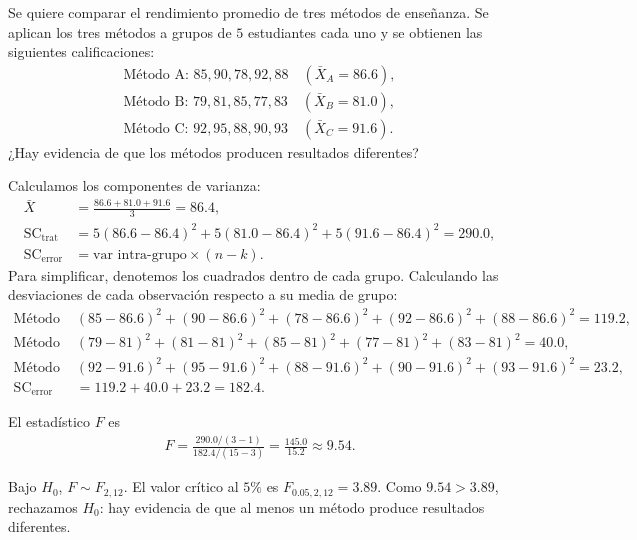 \begin{ejemplo}
 \label{exmp:3.2.6}
Se quiere comparar el rendimiento promedio de tres m\'etodos de ense\~nanza. Se
aplican los tres m\'etodos a grupos de $5$ estudiantes cada uno y se obtienen las
siguientes calificaciones:
\begin{align}
 \text{M\'etodo A: } 85, 90, 78, 92, 88 \quad (\bar{X}_A = 86.6), \\
 \text{M\'etodo B: } 79, 81, 85, 77, 83 \quad (\bar{X}_B = 81.0), \\
 \text{M\'etodo C: } 92, 95, 88, 90, 93 \quad (\bar{X}_C = 91.6).
\end{align}
¿Hay evidencia de que los m\'etodos producen resultados diferentes?
\end{ejemplo}

\begin{solucion}
Calculamos los componentes de varianza:
\begin{align}
 \bar{X} &= \frac{86.6 + 81.0 + 91.6}{3} = 86.4, \\
 \text{SC}_{\text{trat}} &= 5(86.6 - 86.4)^2 + 5(81.0 - 86.4)^2 + 5(91.6 - 86.4)^2 = 290.0, \\
 \text{SC}_{\text{error}} &= \text{var intra-grupo} \times (n - k).
\end{align}
Para simplificar, denotemos los cuadrados dentro de cada grupo. Calculando las
desviaciones de cada observaci\'on respecto a su media de grupo:
\begin{align}
 \text{M\'etodo A: } & (85-86.6)^2 + (90-86.6)^2 + (78-86.6)^2 + (92-86.6)^2 + (88-86.6)^2 = 119.2, \\
 \text{M\'etodo B: } & (79-81)^2 + (81-81)^2 + (85-81)^2 + (77-81)^2 + (83-81)^2 = 40.0, \\
 \text{M\'etodo C: } & (92-91.6)^2 + (95-91.6)^2 + (88-91.6)^2 + (90-91.6)^2 + (93-91.6)^2 = 23.2, \\
 \text{SC}_{\text{error}} &= 119.2 + 40.0 + 23.2 = 182.4.
\end{align}

El estad\'istico $F$ es
\begin{align}
 F = \frac{290.0/(3-1)}{182.4/(15-3)} = \frac{145.0}{15.2} \approx 9.54.
\end{align}

Bajo $H_0$, $F \sim F_{2, 12}$. El valor cr\'itico al $5\%$ es $F_{0.05, 2, 12} = 3.89$.
Como $9.54 > 3.89$, rechazamos $H_0$: hay evidencia de que al menos un m\'etodo
produce resultados diferentes.
\end{solucion}

